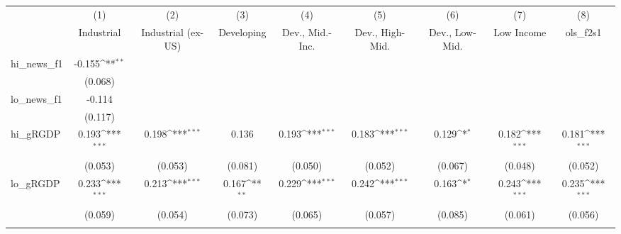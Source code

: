 {
\def\sym#1{\ifmmode^{#1}\else\(^{#1}\)\fi}
\begin{tabular}{l*{8}{c}}
\toprule
            &\multicolumn{1}{c}{(1)}&\multicolumn{1}{c}{(2)}&\multicolumn{1}{c}{(3)}&\multicolumn{1}{c}{(4)}&\multicolumn{1}{c}{(5)}&\multicolumn{1}{c}{(6)}&\multicolumn{1}{c}{(7)}&\multicolumn{1}{c}{(8)}\\
            &\multicolumn{1}{c}{Industrial}&\multicolumn{1}{c}{Industrial (ex-US)}&\multicolumn{1}{c}{Developing}&\multicolumn{1}{c}{Dev., Mid.-Inc.}&\multicolumn{1}{c}{Dev., High-Mid.}&\multicolumn{1}{c}{Dev., Low-Mid.}&\multicolumn{1}{c}{Low Income}&\multicolumn{1}{c}{ols\_f2s1}\\
\midrule
hi\_news\_f1  &      -0.155\sym{**} &                     &                     &                     &                     &                     &                     &                     \\
            &     (0.068)         &                     &                     &                     &                     &                     &                     &                     \\
\addlinespace
lo\_news\_f1  &      -0.114         &                     &                     &                     &                     &                     &                     &                     \\
            &     (0.117)         &                     &                     &                     &                     &                     &                     &                     \\
\addlinespace
hi\_gRGDP    &       0.193\sym{***}&       0.198\sym{***}&       0.136         &       0.193\sym{***}&       0.183\sym{***}&       0.129\sym{*}  &       0.182\sym{***}&       0.181\sym{***}\\
            &     (0.053)         &     (0.053)         &     (0.081)         &     (0.050)         &     (0.052)         &     (0.067)         &     (0.048)         &     (0.052)         \\
\addlinespace
lo\_gRGDP    &       0.233\sym{***}&       0.213\sym{***}&       0.167\sym{**} &       0.229\sym{***}&       0.242\sym{***}&       0.163\sym{*}  &       0.243\sym{***}&       0.235\sym{***}\\
            &     (0.059)         &     (0.054)         &     (0.073)         &     (0.065)         &     (0.057)         &     (0.085)         &     (0.061)         &     (0.056)         \\
\addlinespace

\end{tabular}}
